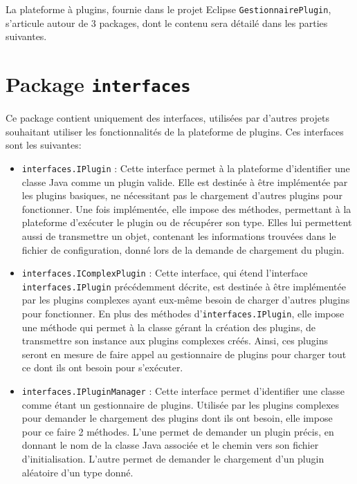 
La plateforme à plugins, fournie dans le projet Eclipse \texttt{GestionnairePlugin}, s'articule autour de 3 packages, dont le contenu sera détailé dans les parties suivantes.


\section{Package \texttt{interfaces}}

Ce package contient uniquement des interfaces, utilisées par d'autres projets souhaitant utiliser les fonctionnalités de la plateforme de plugins. Ces interfaces sont les suivantes:\\

\begin{itemize}
	\item \texttt{interfaces.IPlugin} : Cette interface permet à la plateforme d'identifier une classe Java comme un plugin valide. Elle est destinée à être implémentée par les plugins basiques, ne nécessitant pas le chargement d'autres plugins pour fonctionner. Une fois implémentée, elle impose des méthodes, permettant à la plateforme d'exécuter le plugin ou de récupérer son type. Elles lui permettent aussi de transmettre un objet, contenant les informations trouvées dans le fichier de configuration, donné lors de la demande de chargement du plugin.
	\item \texttt{interfaces.IComplexPlugin} : Cette interface, qui étend l'interface \texttt{interfaces.IPlugin} précédemment décrite, est destinée à être implémentée par les plugins complexes ayant eux-même besoin de charger d'autres plugins pour fonctionner. En plus des méthodes d'\texttt{interfaces.IPlugin}, elle impose une méthode qui permet à la classe gérant la création des plugins, de transmettre son instance aux plugins complexes créés. Ainsi, ces plugins seront en mesure de faire appel au gestionnaire de plugins pour charger tout ce dont ils ont besoin pour s'exécuter.
	\item \texttt{interfaces.IPluginManager} :  Cette interface permet d'identifier une classe comme étant un gestionnaire de plugins. Utilisée par les plugins complexes pour demander le chargement des plugins dont ils ont besoin, elle impose pour ce faire 2 méthodes. L'une permet de demander un plugin précis, en donnant le nom de la classe Java associée et le chemin vers son fichier d'initialisation. L'autre permet de demander le chargement d'un plugin aléatoire d'un type donné.
\end{itemize}


